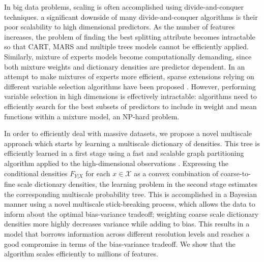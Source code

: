 \documentclass{article} %
\begin{document}
In big data problems, scaling is often accomplished using divide-and-conquer techniques. 
% 
a significant downside of many divide-and-conquer algorithms is their poor scalability to high dimensional predictors. As the number of features increases, the problem of finding the best splitting attribute becomes intractable so that CART, MARS and multiple trees models cannot be efficiently applied. Similarly, mixture of experts models become computationally demanding, since both mixture weights and dictionary densities are predictor dependent. In an attempt to make mixtures of experts more efficient, sparse extensions relying on different variable selection algorithms have been proposed \cite{SparseMoF}. However, performing variable selection in high dimensions is effectively intractable: algorithms need to efficiently search for the best subsets of predictors to include in weight and mean functions within a mixture model, an NP-hard problem.

 In order to efficiently deal with massive datasets, we propose a novel multiscale approach which starts by learning a multiscale dictionary of densities. This tree is efficiently learned in a first stage using a fast and scalable graph partitioning algorithm applied to the high-dimensional observations \cite{metis}.  Expressing the conditional densities $F_{Y|X}$ for each $x \in \mathcal{X}$ as a convex combination of coarse-to-fine scale dictionary densities, the learning problem in the second stage estimates the corresponding multiscale probability tree.  This is accomplished in a Bayesian manner using a novel multiscale stick-breaking process, which allows the data to inform about the optimal bias-variance tradeoff; weighting coarse scale dictionary densities more highly decreases variance while adding to bias.  This results in a model that borrows information across different resolution levels and reaches a good compromise in terms of the bias-variance tradeoff. We show that the algorithm scales efficiently to millions of features. 
\end{document}
